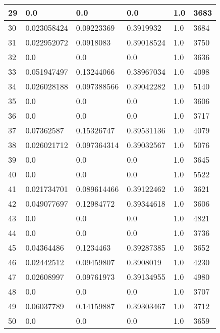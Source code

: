 \begin{longtable}{|l|l|l|l|l|l|}
29 & 0.0 & 0.0 & 0.0 & 1.0 & 3683 \\ \hline 
30 & 0.023058424 & 0.09223369 & 0.3919932 & 1.0 & 3684 \\ \hline 
31 & 0.022952072 & 0.0918083 & 0.39018524 & 1.0 & 3750 \\ \hline 
32 & 0.0 & 0.0 & 0.0 & 1.0 & 3636 \\ \hline 
33 & 0.051947497 & 0.13244066 & 0.38967034 & 1.0 & 4098 \\ \hline 
34 & 0.026028188 & 0.097388566 & 0.39042282 & 1.0 & 5140 \\ \hline 
35 & 0.0 & 0.0 & 0.0 & 1.0 & 3606 \\ \hline 
36 & 0.0 & 0.0 & 0.0 & 1.0 & 3717 \\ \hline 
37 & 0.07362587 & 0.15326747 & 0.39531136 & 1.0 & 4079 \\ \hline 
38 & 0.026021712 & 0.097364314 & 0.39032567 & 1.0 & 5076 \\ \hline 
39 & 0.0 & 0.0 & 0.0 & 1.0 & 3645 \\ \hline 
40 & 0.0 & 0.0 & 0.0 & 1.0 & 5522 \\ \hline 
41 & 0.021734701 & 0.089614466 & 0.39122462 & 1.0 & 3621 \\ \hline 
42 & 0.049077697 & 0.12984772 & 0.39344618 & 1.0 & 3606 \\ \hline 
43 & 0.0 & 0.0 & 0.0 & 1.0 & 4821 \\ \hline 
44 & 0.0 & 0.0 & 0.0 & 1.0 & 3736 \\ \hline 
45 & 0.04364486 & 0.1234463 & 0.39287385 & 1.0 & 3652 \\ \hline 
46 & 0.02442512 & 0.09459807 & 0.3908019 & 1.0 & 4230 \\ \hline 
47 & 0.02608997 & 0.09761973 & 0.39134955 & 1.0 & 4980 \\ \hline 
48 & 0.0 & 0.0 & 0.0 & 1.0 & 3707 \\ \hline 
49 & 0.06037789 & 0.14159887 & 0.39303467 & 1.0 & 3712 \\ \hline 
50 & 0.0 & 0.0 & 0.0 & 1.0 & 3659 \\ \hline 
\end{longtable}